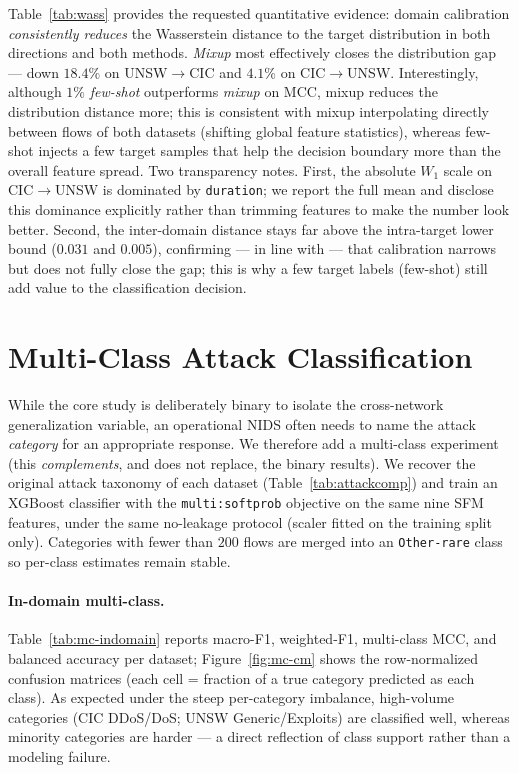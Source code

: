 \documentclass[preprint,12pt,authoryear]{elsarticle}
\begin{document}
Table~\ref{tab:wass} provides the requested quantitative evidence: domain
calibration \emph{consistently reduces} the Wasserstein distance to the target
distribution in both directions and both methods. \emph{Mixup} most effectively
closes the distribution gap --- down $18.4\%$ on UNSW$\rightarrow$CIC and $4.1\%$
on CIC$\rightarrow$UNSW. Interestingly, although $1\%$ \emph{few-shot} outperforms
\emph{mixup} on MCC, mixup reduces the distribution distance more; this is
consistent with mixup interpolating directly between flows of both datasets
(shifting global feature statistics), whereas few-shot injects a few target
samples that help the decision boundary more than the overall feature spread. Two
transparency notes. First, the absolute $W_1$ scale on CIC$\rightarrow$UNSW is
dominated by \texttt{duration}; we report the full mean and disclose this
dominance explicitly rather than trimming features to make the number look better.
Second, the inter-domain distance stays far above the intra-target lower bound
($0.031$ and $0.005$), confirming --- in line with \citet{layeghy} --- that
calibration narrows but does not fully close the gap; this is why a few target
labels (few-shot) still add value to the classification decision.

\section{Multi-Class Attack Classification}
\label{sec:multiclass}

While the core study is deliberately binary to isolate the cross-network
generalization variable, an operational NIDS often needs to name the attack
\emph{category} for an appropriate response. We therefore add a multi-class
experiment (this \emph{complements}, and does not replace, the binary results). We
recover the original attack taxonomy of each dataset (Table~\ref{tab:attackcomp})
and train an XGBoost classifier with the \texttt{multi:softprob} objective on the
same nine SFM features, under the same no-leakage protocol (scaler fitted on the
training split only). Categories with fewer than $200$ flows are merged into an
\texttt{Other-rare} class so per-class estimates remain stable.

\paragraph{In-domain multi-class.} Table~\ref{tab:mc-indomain} reports macro-F1,
weighted-F1, multi-class MCC, and balanced accuracy per dataset; Figure~\ref{fig:mc-cm}
shows the row-normalized confusion matrices (each cell = fraction of a true
category predicted as each class). As expected under the steep per-category
imbalance, high-volume categories (CIC DDoS/DoS; UNSW Generic/Exploits) are
classified well, whereas minority categories are harder --- a direct reflection of
class support rather than a modeling failure.
\end{document}
